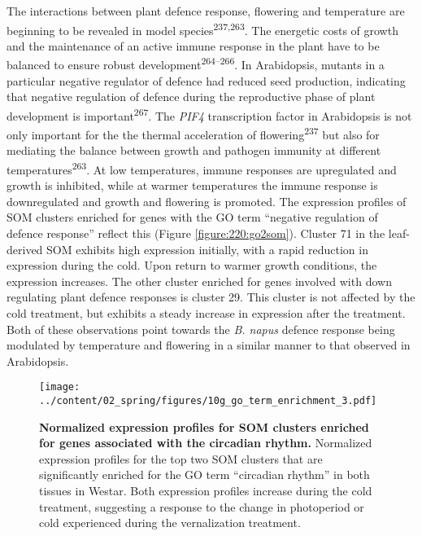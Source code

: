 \documentclass[12pt,]{book}
\begin{document}
The interactions between plant defence response, flowering and
temperature are beginning to be revealed in model
species\textsuperscript{237,263}. The energetic costs of growth and the
maintenance of an active immune response in the plant have to be
balanced to ensure robust development\textsuperscript{264--266}. In
Arabidopsis, mutants in a particular negative regulator of defence had
reduced seed production, indicating that negative regulation of defence
during the reproductive phase of plant development is
important\textsuperscript{267}. The \emph{PIF4} transcription factor in
Arabidopsis is not only important for the the thermal acceleration of
flowering\textsuperscript{237} but also for mediating the balance
between growth and pathogen immunity at different
temperatures\textsuperscript{263}. At low temperatures, immune responses
are upregulated and growth is inhibited, while at warmer temperatures
the immune response is downregulated and growth and flowering is
promoted. The expression profiles of SOM clusters enriched for genes
with the GO term ``negative regulation of defence response'' reflect
this (Figure \ref{figure:220:go2som}). Cluster 71 in the leaf-derived
SOM exhibits high expression initially, with a rapid reduction in
expression during the cold. Upon return to warmer growth conditions, the
expression increases. The other cluster enriched for genes involved with
down regulating plant defence responses is cluster 29. This cluster is
not affected by the cold treatment, but exhibits a steady increase in
expression after the treatment. Both of these observations point towards
the \emph{B. napus} defence response being modulated by temperature and
flowering in a similar manner to that observed in Arabidopsis.

\begin{figure}[htbp]
\centering
\texttt{[image: ../content/02\_spring/figures/10g\_go\_term\_enrichment\_3.pdf]}
\caption{\textbf{Normalized expression profiles for SOM clusters
enriched for genes associated with the circadian rhythm.} Normalized
expression profiles for the top two SOM clusters that are significantly
enriched for the GO term ``circadian rhythm'' in both tissues in Westar.
Both expression profiles increase during the cold treatment, suggesting
a response to the change in photoperiod or cold experienced during the
vernalization treatment.}\label{figure:221:go3som}
\end{figure}
\end{document}
